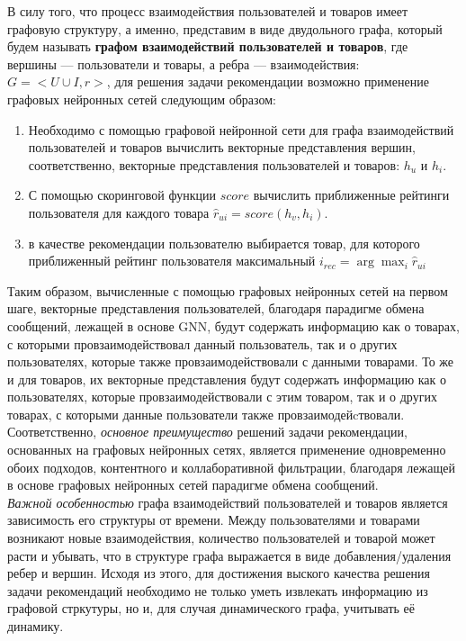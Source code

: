 \documentclass[a4paper,14pt,oneside]{mipt-thesis-ms}
\begin{document}
В силу того, что процесс взаимодействия пользователей и товаров имеет графовую структуру, а именно, представим в виде двудольного графа, который будем называть {\bf графом взаимодействий пользователей и товаров}, где вершины --- пользователи и товары, а ребра --- взаимодействия: $G = <U \cup I, r>$, для решения задачи рекомендации возможно применение графовых нейронных сетей следующим образом:
\begin{enumerate}
\item Необходимо с помощью графовой нейронной сети для графа взаимодействий пользователей и товаров вычислить векторные представления вершин, соответственно, векторные представления пользователей и товаров: $h_u$ и $h_i$.
\item С помощью скоринговой функции $score$ вычислить приближенные рейтинги пользователя для каждого товара $\hat r_{ui} = score(h_v, h_i)$.
\item в качестве рекомендации пользователю выбирается товар, для которого приближенный рейтинг пользователя максимальный $i_{rec} = \arg \max_i \hat r_{ui}$
\end{enumerate}

Таким образом, вычисленные с помощью графовых нейронных сетей на первом шаге, векторные представления пользователей, благодаря парадигме обмена сообщений, лежащей в основе GNN, будут содержать информацию как о товарах, с которыми провзаимодействовал данный пользователь, так и о других пользователях, которые также провзаимодействовали с данными товарами. То же и для товаров, их векторные представления будут содержать информацию как о пользователях, которые провзаимодействовали с этим товаром, так и о других товарах, с которыми данные пользователи также провзаимодейcтвовали.\\

Соответственно, {\it основное преимущество} решений задачи рекомендации, основанных на графовых нейронных сетях, является применение одновременно обоих подходов, контентного и коллаборативной фильтрации, благодаря лежащей в основе графовых нейронных сетей парадигме обмена сообщений.\\

{\it Важной особенностью} графа взаимодействий пользователей и товаров является зависимость его структуры от времени. Между пользователями и товарами возникают новые взаимодействия, количество пользователей и товарой может расти и убывать, что в структуре графа выражается в виде добавления/удаления ребер и вершин. Исходя из этого, для достижения выского качества решения задачи рекомендаций необходимо не только уметь извлекать информацию из графовой стркутуры, но и, для случая динамического графа, учитывать её динамику.
\end{document}
